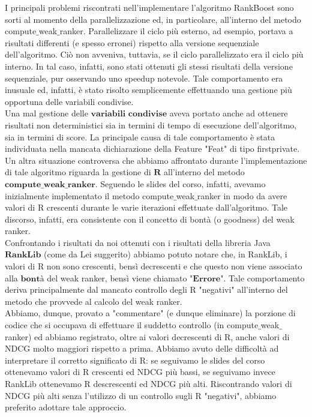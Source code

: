 I principali problemi riscontrati nell'implementare l'algoritmo RankBoost sono sorti al momento della parallelizzazione ed, in particolare, all'interno del metodo compute$\_$weak$\_$ranker. Parallelizzare il ciclo più esterno, ad esempio, portava a risultati differenti (e spesso erronei) rispetto alla versione sequenziale dell'algoritmo. Ciò non avveniva, tuttavia, se il ciclo parallelizzato era il ciclo più interno. In tal caso, infatti, sono stati ottenuti gli stessi risultati della versione sequenziale, pur osservando uno speedup notevole. Tale comportamento era inusuale ed, infatti, è stato risolto semplicemente effettuando una gestione più opportuna delle variabili condivise.\\
Una mal gestione delle $\textbf{variabili condivise}$ aveva portato anche ad ottenere risultati non deterministici sia in termini di tempo di esecuzione dell'algoritmo, sia in termini di score. La principale causa di tale comportamento è stata individuata nella mancata dichiarazione della Feature "Feat" di tipo firstprivate.\\
Un altra situazione controversa che abbiamo affrontato durante l'implementazione di tale algoritmo riguarda la gestione di $\textbf{R}$ all'interno del metodo $\textbf{compute}\_\textbf{weak}\_\textbf{ranker}$. Seguendo le slides del corso, infatti, avevamo inizialmente implementato il metodo compute$\_$weak$\_$ranker in modo da avere valori di R crescenti durante le varie iterazioni effettuate dall'algoritmo. Tale discorso, infatti, era consistente con il concetto di bontà (o goodness) del weak ranker.\\
Confrontando i risultati da noi ottenuti con i risultati della libreria Java $\textbf{RankLib}$ (come da Lei suggerito) abbiamo potuto notare che, in RankLib, i valori di R non sono crescenti, bensì decrescenti e che questo non viene associato alla $\textbf{bontà}$ del weak ranker, bensì viene chiamato $\textbf{"Errore"}$. Tale comportamento deriva principalmente dal mancato controllo degli R "negativi" all'interno del metodo che provvede al calcolo del weak ranker.\\
Abbiamo, dunque, provato a "commentare" (e dunque eliminare) la porzione di codice che si occupava di effettuare il suddetto controllo (in compute$\_$weak$\_$ranker) ed abbiamo registrato, oltre ai valori decrescenti di R, anche valori di NDCG molto maggiori rispetto a prima. Abbiamo avuto delle difficoltà ad interpretare il corretto significato di R: se seguivamo le slides del corso ottenevamo valori di R crescenti ed NDCG più bassi, se seguivamo invece RankLib ottenevamo R descrescenti ed NDCG più alti. Riscontrando valori di NDCG più alti senza l'utilizzo di un controllo sugli R "negativi", abbiamo preferito adottare tale approccio.\\
